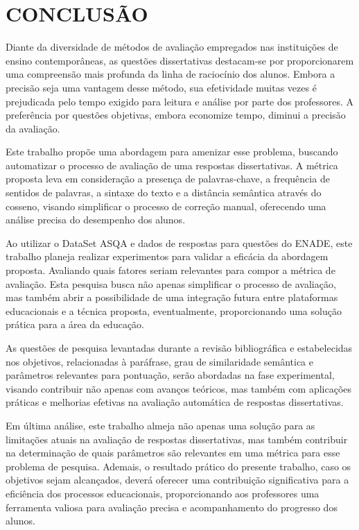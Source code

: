 \chapter{CONCLUSÃO}

Diante da diversidade de métodos de avaliação empregados nas instituições de ensino contemporâneas, as questões dissertativas destacam-se por proporcionarem uma compreensão mais profunda da linha de raciocínio dos alunos. Embora a precisão seja uma vantagem desse método, sua efetividade muitas vezes é prejudicada pelo tempo exigido para leitura e análise por parte dos professores. A preferência por questões objetivas, embora economize tempo, diminui a precisão da avaliação.

Este trabalho propõe uma abordagem para amenizar esse problema, buscando automatizar o processo de avaliação de uma respostas dissertativas. A métrica proposta leva em consideração a presença de palavras-chave, a frequência de sentidos de palavras, a sintaxe do texto e a distância semântica através do cosseno, visando simplificar o processo de correção manual, oferecendo uma análise precisa do desempenho dos alunos.

Ao utilizar o DataSet ASQA e dados de respostas para questões do ENADE, este trabalho planeja realizar experimentos para validar a eficácia da abordagem proposta. Avaliando quais fatores seriam relevantes para compor a métrica de avaliação. Esta pesquisa busca não apenas simplificar o processo de avaliação, mas também abrir a possibilidade de uma integração futura entre plataformas educacionais e a técnica proposta, eventualmente, proporcionando uma solução prática para a área da educação.

As questões de pesquisa levantadas durante a revisão bibliográfica e estabelecidas nos objetivos, relacionadas à paráfrase, grau de similaridade semântica e parâmetros relevantes para pontuação, serão abordadas na fase experimental, visando contribuir não apenas com avanços teóricos, mas também com aplicações práticas e melhorias efetivas na avaliação automática de respostas dissertativas.

Em última análise, este trabalho almeja não apenas uma solução para as limitações atuais na avaliação de respostas dissertativas, mas também contribuir na determinação de quais parâmetros são relevantes em uma métrica para esse problema de pesquisa. Ademais, o resultado prático do presente trabalho, caso os objetivos sejam alcançados, deverá oferecer uma contribuição significativa para a eficiência dos processos educacionais, proporcionando aos professores uma ferramenta valiosa para avaliação precisa e acompanhamento do progresso dos alunos.